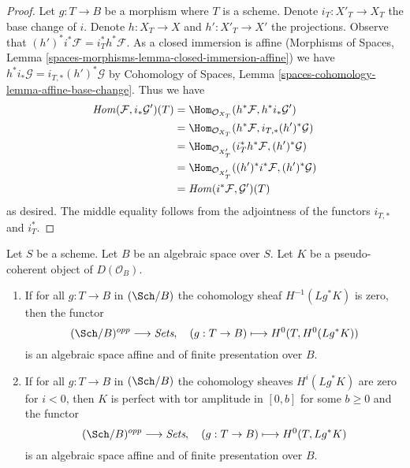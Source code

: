 \begin{proof}
Let $g : T \to B$ be a morphism where $T$ is a scheme.
Denote $i_T : X'_T \to X_T$ the base change of $i$.
Denote $h : X_T \to X$ and $h' : X'_T \to X'$ the projections.
Observe that $(h')^*i^*\mathcal{F} = i_T^*h^*\mathcal{F}$.
As a closed immersion is affine
(Morphisms of Spaces, Lemma
\ref{spaces-morphisms-lemma-closed-immersion-affine})
we have $h^*i_*\mathcal{G} = i_{T, *}(h')^*\mathcal{G}$ by
Cohomology of Spaces, Lemma \ref{spaces-cohomology-lemma-affine-base-change}.
Thus we have
\begin{align*}
\mathit{Hom}(\mathcal{F}, i_*\mathcal{G}')(T)
& =
\Hom_{\mathcal{O}_{X_T}}(h^*\mathcal{F}, h^*i_*\mathcal{G}') \\
& =
\Hom_{\mathcal{O}_{X_T}}(h^*\mathcal{F}, i_{T, *}(h')^*\mathcal{G}) \\
& =
\Hom_{\mathcal{O}_{X'_T}}(i_T^*h^*\mathcal{F}, (h')^*\mathcal{G}) \\
& =
\Hom_{\mathcal{O}_{X'_T}}((h')^*i^*\mathcal{F}, (h')^*\mathcal{G}) \\
& =
\mathit{Hom}(i^*\mathcal{F}, \mathcal{G}')(T)
\end{align*}
as desired. The middle equality follows from the adjointness of the functors
$i_{T, *}$ and $i_T^*$.
\end{proof}

\begin{lemma}
\label{lemma-cohomology-perfect-complex}
Let $S$ be a scheme. Let $B$ be an algebraic space over $S$.
Let $K$ be a pseudo-coherent object of $D(\mathcal{O}_B)$.
\begin{enumerate}
\item If for all $g : T \to B$ in $(\Sch/B)$ the cohomology sheaf
$H^{-1}(Lg^*K)$ is zero, then the functor
$$
(\Sch/B)^{opp} \longrightarrow \textit{Sets},\quad
(g : T \to B) \longmapsto H^0(T, H^0(Lg^*K))
$$
is an algebraic space affine and of finite presentation over $B$.
\item If for all $g : T \to B$ in $(\Sch/B)$ the cohomology sheaves
$H^i(Lg^*K)$ are zero for $i < 0$, then $K$ is perfect with tor amplitude
in $[0, b]$ for some $b \geq 0$ and the functor
$$
(\Sch/B)^{opp} \longrightarrow \textit{Sets},\quad
(g : T \to B) \longmapsto H^0(T, Lg^*K)
$$
is an algebraic space affine and of finite presentation over $B$.
\end{enumerate}
\end{lemma}

